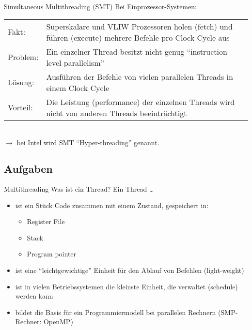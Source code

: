 \begin{defi}[Threads]{Simultaneous Multithreading (SMT)}
    Bei Einprozessor-Systemen: \\
    \begin{tabularx}{\textwidth}{@{}lX@{}}
        Fakt:    & Superskalare und VLIW Prozessoren holen (fetch) und führen (execute) mehrere Befehle pro Clock Cycle aus \\
        Problem: & Ein einzelner Thread besitzt nicht genug \enquote{instruction-level parallelism}                         \\
        Lösung:  & Ausführen der Befehle von vielen parallelen Threads in einem Clock Cycle                                 \\
        Vorteil: & Die Leistung (performance) der einzelnen Threads wird nicht von anderen Threads beeinträchtigt           \\
    \end{tabularx}
    \\
    $\to$ bei Intel wird SMT \enquote{Hyper-threading} genannt.
\end{defi}

\subsection{Aufgaben}

\begin{aufgabe}{Multithreading}
    Was ist ein Thread?
    \tcblower
    Ein Thread \ldots
    \begin{itemize}[$\ldots$]
        \item ist ein Stück Code zusammen mit einem Zustand, gespeichert in:
              \begin{itemize}
                  \item Register File
                  \item Stack
                  \item Program pointer
              \end{itemize}
        \item ist eine \enquote{leichtgewichtige} Einheit für den Ablauf von Befehlen (light-weight)
        \item ist in vielen Betriebssystemen die kleinste Einheit, die verwaltet (schedule) werden kann
        \item bildet die Basis für ein Programmiermodell bei parallelen Rechnern (SMP-Rechner: OpenMP)
    \end{itemize}
\end{aufgabe}

